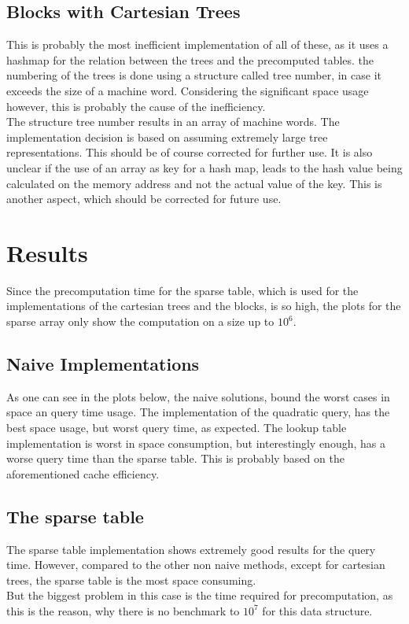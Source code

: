 \documentclass[a4paper,UKenglish,cleveref,thm-restate]{lipics-v2021}
\begin{document}
\subsection{Blocks with Cartesian Trees}
This is probably the most inefficient implementation of all of these, as it uses a hashmap for the relation between the trees and the precomputed tables. the numbering of the trees is done using a structure called tree number, in case it exceeds the size of a machine word. Considering the significant space usage however, this is probably the cause of the inefficiency.\\
The structure tree number results in an array of machine words. The implementation decision is based on assuming extremely large tree representations. This should be of course corrected for further use. It is also unclear if the use of an array as key for a hash map, leads to the hash value being calculated on the memory address and not the actual value of the key. This is another aspect, which should be corrected for future use.

\section{Results}
Since the precomputation time for the sparse table, which is used for the implementations of the cartesian trees and the blocks, is so high, the plots for the sparse array only show the computation on a size up to $10^6$.\\

\subsection{Naive Implementations}
As one can see in the plots below, the naive solutions, bound the worst cases in space an query time usage. The implementation of the quadratic query, has the best space usage, but worst query time, as expected. The lookup table implementation is worst in space consumption, but interestingly enough, has a worse query time than the sparse table. This is probably based on the aforementioned cache efficiency.
\subsection{The sparse table}
The sparse table implementation shows extremely good results for the query time. However, compared to the other non naive methods, except for cartesian trees, the sparse table is the most space consuming.\\
But the biggest problem in this case is the time required for precomputation, as this is the reason, why there is no benchmark to $10^7$ for this data structure.
\end{document}
